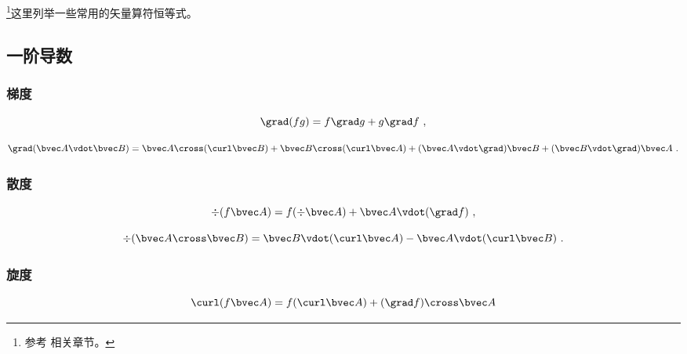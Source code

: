 
\begin{issues}
\issueAbstract
\end{issues}



\footnote{参考 \cite{GriffE} 相关章节。}这里列举一些常用的矢量算符恒等式。

\subsection{一阶导数}
\subsubsection{梯度}
\begin{equation}\label{eq_VopEq_2}
\grad (fg) = f\grad g + g \grad f~,
\end{equation}

\begin{equation}
\grad (\bvec A \vdot \bvec B) = \bvec A \cross (\curl \bvec B) + \bvec B \cross (\curl \bvec A) + (\bvec A \vdot \grad) \bvec B + (\bvec B \vdot \grad) \bvec A~.
\end{equation}

\subsubsection{散度}

\begin{equation}\label{eq_VopEq_1}
\div (f \bvec A) = f (\div \bvec A) + \bvec A \vdot (\grad f)~,
\end{equation}

\begin{equation}\label{eq_VopEq_4}
\div (\bvec A \cross \bvec B) = \bvec B \vdot (\curl \bvec A) - \bvec A \vdot (\curl \bvec B)~.
\end{equation}

\subsubsection{旋度}
\begin{equation}\label{eq_VopEq_3}
\curl(f\bvec A) = f (\curl\bvec A) + (\grad f) \cross\bvec A
\end{equation}

